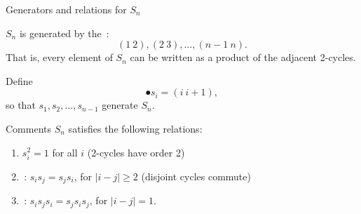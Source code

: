 \documentclass[9pt]{beamer}
\begin{document}
\begin{frame}{Generators and relations for $S_{n}$}

$S_{n}$ is generated by the \,:
\[
(1\ 2), (2\ 3), \dots, (n-1\ n).
\]
That is, every element of $S_{n}$ can be written as a product of the adjacent 2-cycles.

\bigskip

Define
\[
\spot{s_{i}=(i\ i+1)},
\]
so that $s_{1}, s_{2}, \dots, s_{n-1}$ generate $S_{n}$.

\begin{block}{Comments}
$S_{n}$ satisfies the following relations:
\begin{enumerate}

\item $s_{i}^{2}=1$ for all $i$  (2-cycles have order 2)

\item {}\,: $s_{i}s_{j}=s_{j}s_{i}$, for $|i-j|\geq 2$ (disjoint cycles commute)

\item {}\,: $s_{i}s_{j}s_{i}=s_{j}s_{i}s_{j}$, for $|i-j|=1$.

\end{enumerate}

\end{block}

\end{frame}

\end{document}
